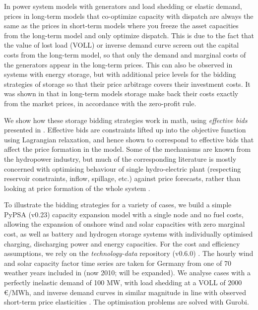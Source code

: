 \documentclass[final,3p]{elsarticle}
\begin{document}
In power system models with generators and load shedding or elastic demand,
prices in long-term models that co-optimize capacity with dispatch are always
the same as the prices in short-term models where you freeze the asset
capacities from the long-term model and only optimize dispatch. This is due to
the fact that the value of lost load (VOLL)  or inverse demand curve screen out
the capital costs from the long-term model, so that only the demand and marginal
costs of the generators appear in the long-term prices. This can also be
observed in systems with energy storage, but with additional price levels for
the bidding strategies of storage so that their price arbitrage covers their
investment costs. It was shown in \cite{Brown2020} that in long-term models
storage make back their costs exactly from the market prices, in accordance with
the zero-profit rule.

We show how these storage bidding strategies work in math, using
\textit{effective bids} presented in \cite{Brown2020}. Effective bids are
constraints lifted up into the objective function using Lagrangian relaxation,
and hence shown to correspond to effective bids that affect the price formation
in the model. Some of the mechanisms are known from the hydropower industry, but
much of the corresponding literature is mostly concerned with optimising
behaviour of single hydro-electric plant (respecting reservoir constraints,
inflow, spillage, etc.) against price forecasts, rather than looking at price
formation of the whole system
\cite{lederer1984overall,Pereira1989,Rotting1992,Fosso1999,CRAMPES2019100746}.

To illustrate the bidding strategies for a variety of cases, we build a simple
PyPSA (v0.23) \cite{PyPSA} capacity expansion model with a single node and no
fuel costs, allowing the expansion of onshore wind and solar capacities with
zero marginal cost, as well as battery and hydrogen storage systems with
individually optimised charging, discharging power and energy capacities. For
the cost and efficiency assumptions, we rely on the \textit{technology-data}
repository (v0.6.0) \cite{lisazeyenPyPSATechnologydata2023}. The hourly wind and
solar capacity factor time series are taken for Germany from one of 70 weather
years included in \cite{rdgdr321} (now 2010; will be expanded). We analyse cases with a perfectly
inelastic demand of 100 MW, with load shedding at a VOLL of 2000 \euro/MWh, and
inverse demand curves in similar magnitude in line with observed short-term
price elasticities \cite{RePEc:zbw:esprep:272048}. The optimisation problems
are solved with Gurobi.
\end{document}
